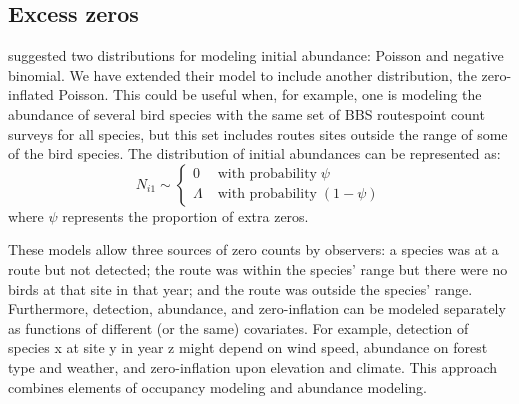 \documentclass[12pt]{article}
\begin{document}
\subsection{Excess zeros}

\citet{dail_madsen:2011} suggested two distributions for modeling
initial abundance: Poisson and negative binomial.  We have extended
their model to include another distribution, the zero-inflated
Poisson.  This could be useful when, for example, one is modeling the
abundance of several bird species with the same set of BBS routespoint
count surveys for all species, but this set includes routes sites
outside the range of some of the bird species.  The distribution of
initial abundances can be represented as:
\begin{equation}
N_{i1} \sim \left\{
\begin{aligned}
0 &\; \text{with probability} \; \psi \\
\Lambda &\; \text{with probability} \; (1-\psi)
\end{aligned} \right.
\label{eq:ZIP}
\end{equation}
where $\psi$ represents the proportion of extra zeros.

These models allow three sources of zero counts by observers: a
species was at a route but not detected; the route was within the
species' range but there were no birds at that site in that year; and
the route was outside the species' range.  Furthermore, detection,
abundance, and zero-inflation can be modeled separately as functions
of different (or the same) covariates.  For example, detection of
species x at site y in year z might depend on wind speed, abundance on
forest type and weather, and zero-inflation upon elevation and
climate.  This approach combines elements of occupancy modeling
\citep{mackenzie_etal:2006} and abundance modeling.


\end{document}

